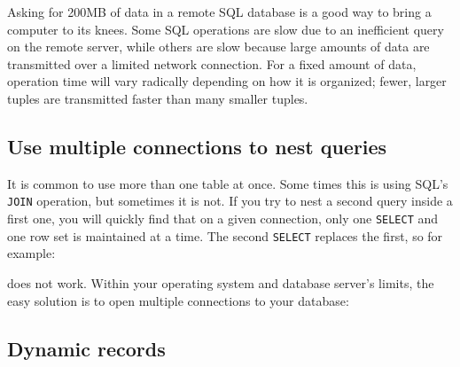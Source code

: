 Asking for 200MB of data in a remote SQL database is a good way to
bring a computer to its knees. Some SQL operations are slow due to an
inefficient query on the remote server, while others are slow because
large amounts of data are transmitted over a limited network
connection. For a fixed amount of data, operation time will vary
radically depending on how it is organized; fewer, larger tuples are
transmitted faster than many smaller tuples.

\subsection{Use multiple connections to nest queries}

It is common to use more than one table at once. Some times this is
using SQL's \texttt{JOIN} operation, but sometimes it
is not. If you try to nest a second query inside a first one, you will
quickly find that on a given connection, only one \texttt{SELECT} and
one row set is maintained at a time. The second \texttt{SELECT}
replaces the first, so for example:


\noindent
does not work. Within your operating system and database
server's limits, the easy solution is to open multiple
connections to your database:


\subsection{Dynamic records}

